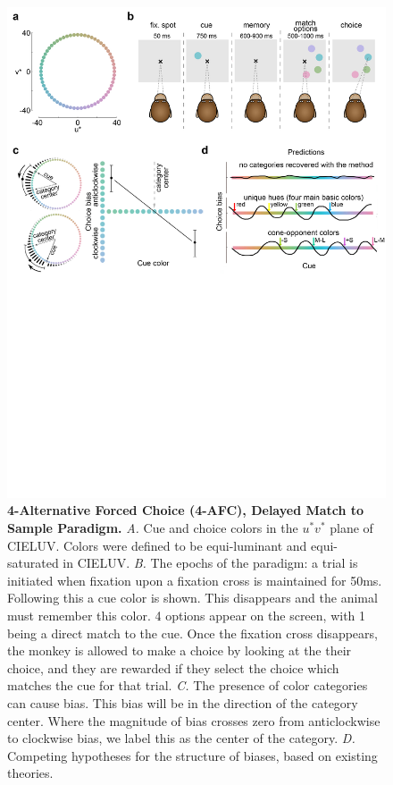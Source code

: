 \begin{figure}
    \includegraphics[width=\textwidth,trim={0 12cm 0 0},clip]{../Figures/flat/F1_ParadigmPredictions_3.jpg}
    
    \caption{\textbf{4-Alternative Forced Choice (4-AFC), Delayed Match to Sample Paradigm.}
    \emph{A.} Cue and choice colors in the $u^*v^*$ plane of CIELUV. Colors were defined to be equi-luminant and equi-saturated in CIELUV.
    \emph{B.} The epochs of the paradigm: a trial is initiated when fixation upon a fixation cross is maintained for 50ms. Following this a cue color is shown. This disappears and the animal must remember this color. 4 options appear on the screen, with 1 being a direct match to the cue. Once the fixation cross disappears, the monkey is allowed to make a choice by looking at the their choice, and they are rewarded if they select the choice which matches the cue for that trial.
    \emph{C.} The presence of color categories can cause bias. This bias will be in the direction of the category center.
    Where the magnitude of bias crosses zero from anticlockwise to clockwise bias, we label this as the center of the category.
    \emph{D.} Competing hypotheses for the structure of biases, based on existing theories.
} 
    \label{fig:ParadigmAnalysisPredictions}
    
\end{figure}

